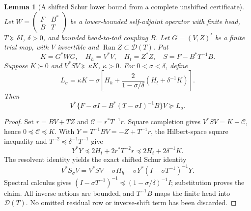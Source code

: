 \documentclass[11pt]{article}
\newtheorem{lemma}[theorem]{Lemma}
\theoremstyle{remark}
\begin{document}
\begin{lemma}[A shifted Schur lower bound from a complete unshifted certificate]
\label{lem:v140-shifted-schur}
Let $W=\left(\begin{smallmatrix}F&B^*\\B&T\end{smallmatrix}\right)$
be a lower-bounded self-adjoint operator with finite head,
$T\succeq\delta I$, $\delta>0$, and bounded head-to-tail coupling $B$.
Let $G=(V,Z)^t$ be a finite trial map, with $V$ invertible and
$\operatorname{Ran}Z\subset\mathcal D(T)$. Put
\[
 K=G^*WG,\quad H_h=V^*V,\quad H_t=Z^*Z,\quad
 S=F-B^*T^{-1}B.
\]
Suppose $K\succ0$ and $V^*SV\succeq\kappa K$, $\kappa>0$.
For $0<\sigma<\delta$, define
\begin{equation}\label{eq:v140-shifted-lower}
 L_\sigma=\kappa K-\sigma\left[H_h+
       \frac{2}{1-\sigma/\delta}(H_t+\delta^{-1}K)\right].
\end{equation}
Then
\[
 V^*\{F-\sigma I-B^*(T-\sigma I)^{-1}B\}V
 \succeq L_\sigma.
\]
\end{lemma}
\begin{proof}
Set $r=BV+TZ$ and $\mathcal C=r^*T^{-1}r$. Square completion gives
$V^*SV=K-\mathcal C$, hence $0\preceq\mathcal C\preceq K$.
With $Y=T^{-1}BV=-Z+T^{-1}r$, the Hilbert-space square inequality
and $T^{-2}\preceq\delta^{-1}T^{-1}$ give
\[
 Y^*Y\preceq2H_t+2r^*T^{-2}r
             \preceq2H_t+2\delta^{-1}K.
\]
The resolvent identity yields the exact shifted Schur identity
\[
 V^*S_\sigma V=V^*SV-\sigma H_h
       -\sigma Y^*(I-\sigma T^{-1})^{-1}Y.
\]
Spectral calculus gives
$(I-\sigma T^{-1})^{-1}\preceq(1-\sigma/\delta)^{-1}I$;
substitution proves the claim. All inverse actions are bounded,
and $T^{-1}B$ maps the finite head into $\mathcal D(T)$.
No omitted residual row or inverse-shift term has been discarded.
\end{proof}
\end{document}
